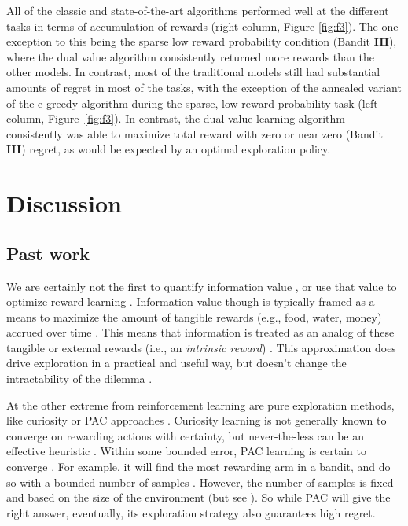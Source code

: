 \documentclass[fleqn,10pt]{wlscirep}
\begin{document}
All of the classic and state-of-the-art algorithms performed well at the different tasks in terms of accumulation of rewards (right column, Figure \ref{fig:f3}). The one exception to this being the sparse low reward probability condition (Bandit \textbf{III}), where the dual value algorithm consistently returned more rewards than the other models. In contrast, most of the traditional models still had substantial amounts of regret in most of the tasks, with the exception of the annealed variant of the e-greedy algorithm during the sparse, low reward probability task (left column, Figure~\ref{fig:f3}). In contrast, the dual value learning algorithm consistently was able to maximize total reward with zero or near zero (Bandit \textbf{III}) regret, as would be expected by an optimal exploration policy.


\section*{Discussion}
\subsection*{Past work}
We are certainly not the first to quantify information value \cite{Kolchinsky2018,CogliatiDezza2017}, or use that value to optimize reward learning \cite{Kelly1956,Schmidhuber1991,Dayan1996,deAbril2018,Itti2009}. Information value though is typically framed as a means to maximize the amount of tangible rewards (e.g., food, water, money) accrued over time \cite{Sutton2018}. This means that information is treated as an analog of these tangible or external rewards (i.e., an \textit{intrinsic reward}) \cite{Schmidhuber1991,Berger-Tal2014,Itti2009,Friston2016}. This approximation does drive exploration in a practical and useful way, but doesn't change the intractability of the dilemma \cite{Thrun1992a,Dayan1996,Findling2018,Gershman2018b}. 


At the other extreme from reinforcement learning are pure exploration methods, like curiosity \cite{Berlyne1950,Jaegle2019,Pathak2017} or PAC approaches \cite{Valiant1984}. Curiosity learning is not generally known to converge on rewarding actions with certainty, but never-the-less can be an effective heuristic \cite{Pathak2017,Burda2018,Colas2019}. Within some bounded error, PAC learning is certain to converge \cite{Valiant1984}. For example, it will find the most rewarding arm in a bandit, and do so with a bounded number of samples \cite{Even-Dar2002}. However, the number of samples is fixed and based on the size of the environment (but see \cite{Even-Dar2006,Strehl2009}). So while PAC will give the right answer, eventually, its exploration strategy also guarantees high regret.
\end{document}
